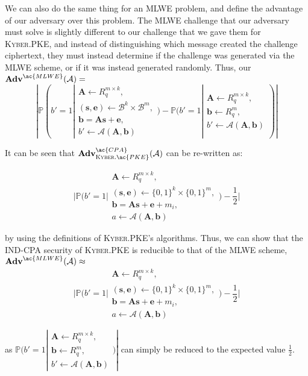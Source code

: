 \documentclass[a4paper, 10pt]{article}
\theoremstyle{definition}
\begin{document}
We can also do the same thing for an \ac{MLWE} problem, and define the advantage of our adversary over this problem. The \ac{MLWE} challenge that our adversary must solve is slightly different to our challenge that we gave them for \textsc{Kyber}.\ac{PKE}, and instead of distinguishing which message created the challenge ciphertext, they must instead determine if the challenge was generated via the \ac{MLWE} scheme, or if it was instead generated randomly. Thus, our $\mathbf{Adv}^{\ac{MLWE}}(\mathcal{A})=$
\[ |\mathbb{P}(b'=1|\substack{\mathbf{A}\leftarrow R^{m\times k}_q,\\ (\mathbf{s, e}) \leftarrow \mathcal{B}^k \times \mathcal{B}^m,\\ \mathbf{b} = \mathbf{As+e},\\ b'\leftarrow \mathcal{A}(\mathbf{A,b})}) - \mathbb{P}(b'=1|\substack{\mathbf{A}\leftarrow R^{m\times k}_q ,\\\mathbf{b}\leftarrow R^m_q,\\ b'\leftarrow \mathcal{A}(\mathbf{A,b})})| \]

It can be seen that $\mathbf{Adv}^{\ac{CPA}}_{\textsc{Kyber}.\ac{PKE}}(\mathcal{A})$ can be re-written as:

\[ |\mathbb{P}(b'=1|\substack{\mathbf{A} \leftarrow R^{m\times k}_q ,\\ (\mathbf{s, e}) \leftarrow \{0, 1\}^k \times \{0,1\}^m ,\\ \mathbf{b} = \mathbf{As} + \mathbf{e} + m_i ,\\ a \leftarrow \mathcal{A}(\mathbf{A,b})}) - \frac{1}{2}| \]

by using the definitions of \textsc{Kyber}.\ac{PKE}'s algorithms. Thus, we can show that the \ac{IND}-\ac{CPA} security of \textsc{Kyber}.\ac{PKE} is reducible to that of the \ac{MLWE} scheme, $\mathbf{Adv}^{\ac{MLWE}}(\mathcal{A})\approx $
\[ |\mathbb{P}(b'=1|\substack{\mathbf{A} \leftarrow R^{m\times k}_q ,\\ (\mathbf{s, e}) \leftarrow \{0, 1\}^k \times \{0,1\}^m ,\\ \mathbf{b} = \mathbf{As} + \mathbf{e} + m_i ,\\ a \leftarrow \mathcal{A}(\mathbf{A,b})}) - \frac{1}{2}| \]

as $\mathbb{P}(b'=1|\substack{\mathbf{A}\leftarrow R^{m\times k}_q ,\\\mathbf{b}\leftarrow R^m_q,\\ b'\leftarrow \mathcal{A}(\mathbf{A,b})})|$ can simply be reduced to the expected value $\frac{1}{2}$.
\end{document}
